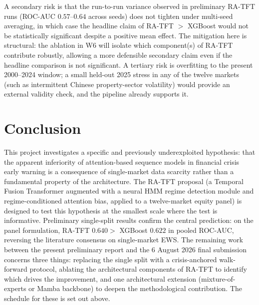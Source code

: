 \documentclass[11pt,a4paper]{article}
\begin{document}
A secondary risk is that the run-to-run variance observed in preliminary
RA-TFT runs (ROC-AUC $0.57$--$0.64$ across seeds) does not tighten under
multi-seed averaging, in which case the headline claim of RA-TFT $>$
XGBoost would not be statistically significant despite a positive mean
effect. The mitigation here is structural: the ablation in W6 will isolate
which component(s) of RA-TFT contribute robustly, allowing a more
defensible secondary claim even if the headline comparison is not
significant. A tertiary risk is overfitting to the present 2000--2024
window; a small held-out 2025 stress in any of the twelve markets (such as
intermittent Chinese property-sector volatility) would provide an external
validity check, and the pipeline already supports it.

\section{Conclusion}
\label{sec:conclusion}

This project investigates a specific and previously underexploited
hypothesis: that the apparent inferiority of attention-based sequence
models in financial crisis early warning is a consequence of single-market
data scarcity rather than a fundamental property of the architecture. The
RA-TFT proposal (a Temporal Fusion Transformer augmented with a neural
HMM regime detection module and regime-conditioned attention bias, applied
to a twelve-market equity panel) is designed to test this hypothesis at
the smallest scale where the test is informative. Preliminary
single-split results confirm the central prediction: on the panel
formulation, RA-TFT $0.640 >$ XGBoost $0.622$ in pooled ROC-AUC, reversing
the literature consensus on single-market EWS. The remaining work between
the present preliminary report and the 6 August 2026 final submission
concerns three things: replacing the single split with a crisis-anchored
walk-forward protocol, ablating the architectural components of RA-TFT to
identify which drives the improvement, and one architectural extension
(mixture-of-experts or Mamba backbone) to deepen the methodological
contribution. The schedule for these is set out above.
\end{document}
